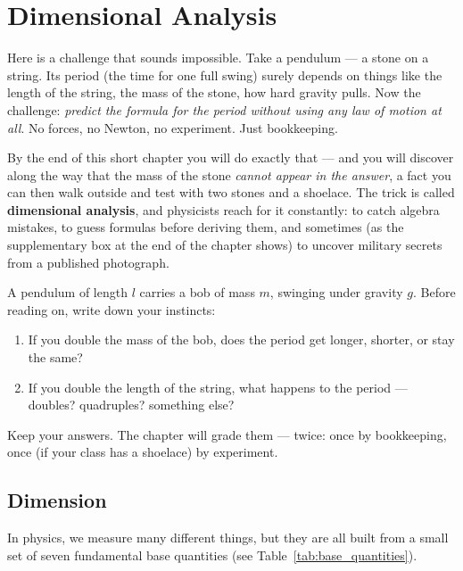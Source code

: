 \chapter{Dimensional Analysis}

Here is a challenge that sounds impossible. Take a pendulum --- a stone on a
string. Its period (the time for one full swing) surely depends on things like
the length of the string, the mass of the stone, how hard gravity pulls. Now
the challenge: \emph{predict the formula for the period without using any law
of motion at all}. No forces, no Newton, no experiment. Just bookkeeping.

By the end of this short chapter you will do exactly that --- and you will
discover along the way that the mass of the stone \emph{cannot appear in the
answer}, a fact you can then walk outside and test with two stones and a
shoelace. The trick is called \textbf{dimensional analysis}, and physicists
reach for it constantly: to catch algebra mistakes, to guess formulas before
deriving them, and sometimes (as the supplementary box at the end of the
chapter shows) to uncover military secrets from a published photograph.

\begin{predictbox}
A pendulum of length $l$ carries a bob of mass $m$, swinging under gravity
$g$. Before reading on, write down your instincts:
\begin{enumerate}[leftmargin=2em, itemsep=1pt]
  \item If you double the mass of the bob, does the period get longer,
        shorter, or stay the same?
  \item If you double the length of the string, what happens to the period ---
        doubles? quadruples? something else?
\end{enumerate}
Keep your answers. The chapter will grade them --- twice: once by bookkeeping,
once (if your class has a shoelace) by experiment.
\end{predictbox}

\section{Dimension}

In physics, we measure many different things, but they are all built from a small set of seven
fundamental base quantities (see Table~\ref{tab:base_quantities}).

